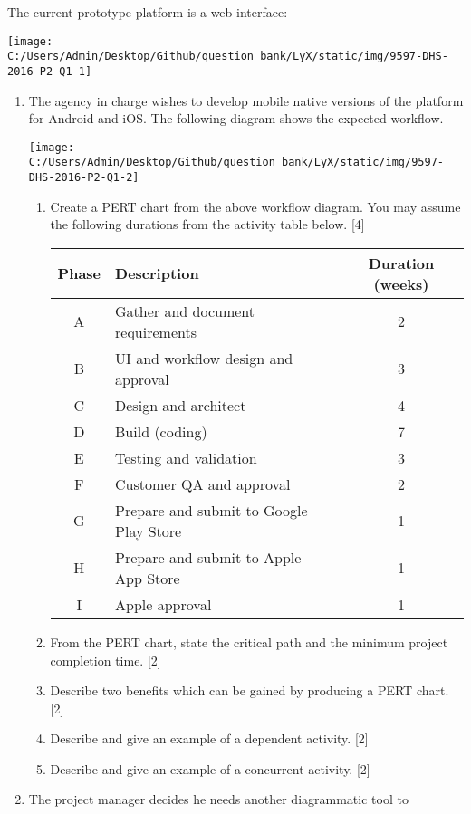 The current prototype platform is a web interface:
\begin{center}
\texttt{[image: C:/Users/Admin/Desktop/Github/question\_bank/LyX/static/img/9597-DHS-2016-P2-Q1-1]}
\par\end{center}
\begin{enumerate}
\item The agency in charge wishes to develop mobile native versions of the
platform for Android and iOS. The following diagram shows the expected
workflow. 
\begin{center}
\texttt{[image: C:/Users/Admin/Desktop/Github/question\_bank/LyX/static/img/9597-DHS-2016-P2-Q1-2]}
\par\end{center}
\begin{enumerate}
\item Create a PERT chart from the above workflow diagram. You may assume
the following durations from the activity table below.\hfill{} {[}4{]}
\noindent \begin{center}
\begin{tabular}{|c|l|c|}
\hline 
Phase & Description & Duration (weeks)\tabularnewline
\hline 
A & Gather and document requirements & 2\tabularnewline
\hline 
B & UI and workflow design and approval & 3\tabularnewline
\hline 
C & Design and architect & 4\tabularnewline
\hline 
D & Build (coding) & 7\tabularnewline
\hline 
E & Testing and validation & 3\tabularnewline
\hline 
F & Customer QA and approval & 2\tabularnewline
\hline 
G & Prepare and submit to Google Play Store & 1\tabularnewline
\hline 
H & Prepare and submit to Apple App Store & 1\tabularnewline
\hline 
I & Apple approval & 1\tabularnewline
\hline 
\end{tabular} 
\par\end{center}
\item From the PERT chart, state the critical path and the minimum project
completion time. \hfill{}{[}2{]}
\item Describe two benefits which can be gained by producing a PERT chart.\hfill{}
{[}2{]}
\item Describe and give an example of a dependent activity. \hfill{}{[}2{]}
\item Describe and give an example of a concurrent activity.\hfill{} {[}2{]}
\end{enumerate}
\item The project manager decides he needs another diagrammatic tool to

\end{enumerate}
